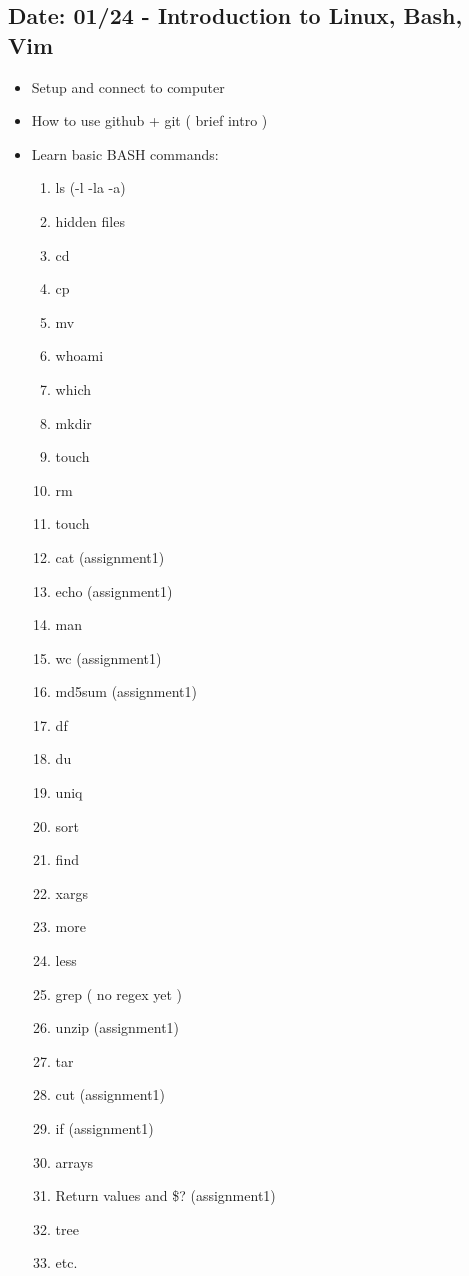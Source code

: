 \documentclass[11pt]{article}
\begin{document}
\subsection*{Date: 01/24 - Introduction to Linux, Bash, Vim }
\begin{itemize}
\item Setup and connect to computer
\item How to use github + git ( brief intro )
\item Learn basic BASH commands:
\begin{multicols}{2}
\begin{enumerate}
    \item ls (-l -la -a)
    \item hidden files
    \item cd
    \item cp
    \item mv
    \item whoami
    \item which
    \item mkdir
    \item touch
    \item rm
    \item touch
    \item cat (assignment1)
    \item echo (assignment1)
    \item man
    \item wc (assignment1)
    \item md5sum (assignment1)
    \item df
    \item du
    \item uniq
    \item sort
    \item find
    \item xargs
    \item more
    \item less
    \item grep ( no regex yet )
    \item unzip (assignment1)
    \item tar
    \item cut (assignment1)
    \item if (assignment1)
    \item arrays
    \item Return values and \$? (assignment1)
    \item tree
    \item etc.

\end{enumerate}
\end{multicols}
\end{itemize}
\end{document}
